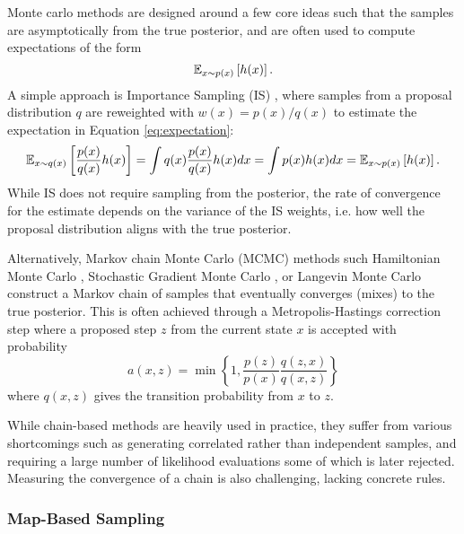 Monte carlo methods are designed around a few core ideas such that the samples are asymptotically from the true posterior, and are often used to compute expectations of the form
\begin{equation} \label{eq:expectation}
    \mathbb{E}_{x \sim p(x)} \left[ h(x) \right].
\end{equation}
A simple approach is Importance Sampling (IS) \citep{kahnMethodsReducingSample1953}, where samples from a proposal distribution $q$ are reweighted with $w(x) = p(x)/q(x)$ to estimate the expectation in Equation \ref{eq:expectation}:
\begin{equation}
    \mathbb{E}_{x \sim q(x)} \left[ \frac{p(x)}{q(x)} h(x) \right]
    = \int q(x) \frac{p(x)}{q(x)} h(x) dx = \int p(x)h(x) dx = \mathbb{E}_{x \sim p(x)} \left[ h(x) \right].
\end{equation}
While IS does not require sampling from the posterior, the rate of convergence for the estimate depends on the variance of the IS weights, i.e. how well the proposal distribution aligns with the true posterior. 

Alternatively, Markov chain Monte Carlo (MCMC) methods such Hamiltonian Monte Carlo \citep{nealMCMCUsingHamiltonian2011}, Stochastic Gradient Monte Carlo \citep{maCompleteRecipeStochastic2015}, or Langevin Monte Carlo \citep{robertsExponentialConvergenceLangevin1996} construct a Markov chain of samples that eventually converges (mixes) to the true posterior. This is often achieved through a Metropolis-Hastings correction step \citep{metropolisEquationStateCalculations1953,hastingsMonteCarloSampling1970} where a proposed step $z$ from the current state $x$ is accepted with probability 
\begin{equation}
    a(x,z) = \min \left\{ 1, \frac{p(z)}{p(x)} \frac{q(z,x)}{q(x,z)} \right\}
\end{equation}
where $q(x, z)$ gives the transition probability from $x$ to $z$. 

While chain-based methods are heavily used in practice, they suffer from various shortcomings such as generating correlated rather than independent samples, and requiring a large number of likelihood evaluations some of which is later rejected. Measuring the convergence of a chain is also challenging, lacking concrete rules. 

\subsubsection{Map-Based Sampling}


